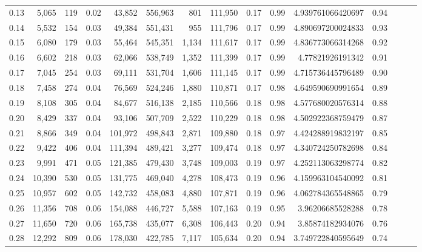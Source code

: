 \begin{tabular}{rrrrrrrrrrrrrrr}
0.13 &   5,065 &    119 &  0.02 &   43,852 &  556,963 &      801 &  111,950 &  0.17 &  0.99 &     4.939761066420697 &      0.94 \\
0.14 &   5,532 &    154 &  0.03 &   49,384 &  551,431 &      955 &  111,796 &  0.17 &  0.99 &     4.890697200024833 &      0.93 \\
0.15 &   6,080 &    179 &  0.03 &   55,464 &  545,351 &    1,134 &  111,617 &  0.17 &  0.99 &     4.836773066314268 &      0.92 \\
0.16 &   6,602 &    218 &  0.03 &   62,066 &  538,749 &    1,352 &  111,399 &  0.17 &  0.99 &      4.77821926191342 &      0.91 \\
0.17 &   7,045 &    254 &  0.03 &   69,111 &  531,704 &    1,606 &  111,145 &  0.17 &  0.99 &     4.715736445796489 &      0.90 \\
0.18 &   7,458 &    274 &  0.04 &   76,569 &  524,246 &    1,880 &  110,871 &  0.17 &  0.98 &     4.649590690991654 &      0.89 \\
0.19 &   8,108 &    305 &  0.04 &   84,677 &  516,138 &    2,185 &  110,566 &  0.18 &  0.98 &     4.577680020576314 &      0.88 \\
0.20 &   8,429 &    337 &  0.04 &   93,106 &  507,709 &    2,522 &  110,229 &  0.18 &  0.98 &     4.502922368759479 &      0.87 \\
0.21 &   8,866 &    349 &  0.04 &  101,972 &  498,843 &    2,871 &  109,880 &  0.18 &  0.97 &     4.424288919832197 &      0.85 \\
0.22 &   9,422 &    406 &  0.04 &  111,394 &  489,421 &    3,277 &  109,474 &  0.18 &  0.97 &     4.340724250782698 &      0.84 \\
0.23 &   9,991 &    471 &  0.05 &  121,385 &  479,430 &    3,748 &  109,003 &  0.19 &  0.97 &     4.252113063298774 &      0.82 \\
0.24 &  10,390 &    530 &  0.05 &  131,775 &  469,040 &    4,278 &  108,473 &  0.19 &  0.96 &     4.159963104540092 &      0.81 \\
0.25 &  10,957 &    602 &  0.05 &  142,732 &  458,083 &    4,880 &  107,871 &  0.19 &  0.96 &     4.062784365548865 &      0.79 \\
0.26 &  11,356 &    708 &  0.06 &  154,088 &  446,727 &    5,588 &  107,163 &  0.19 &  0.95 &      3.96206685528288 &      0.78 \\
0.27 &  11,650 &    720 &  0.06 &  165,738 &  435,077 &    6,308 &  106,443 &  0.20 &  0.94 &      3.85874182934076 &      0.76 \\
0.28 &  12,292 &    809 &  0.06 &  178,030 &  422,785 &    7,117 &  105,634 &  0.20 &  0.94 &     3.749722840595649 &      0.74 \\

\end{tabular}
